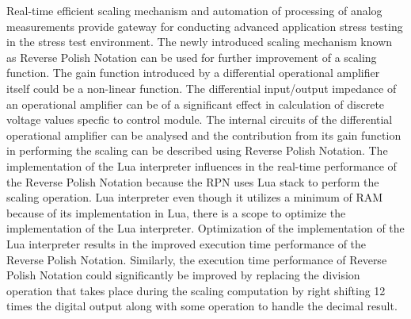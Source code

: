 Real-time efficient scaling mechanism and automation of processing of analog measurements provide gateway for conducting advanced application stress testing in the stress test environment.
The newly introduced scaling mechanism known as Reverse Polish Notation can be used for further improvement of a scaling function. The gain function introduced by a 
differential operational amplifier itself could be a non-linear function. The differential input/output impedance of an operational amplifier can be of a significant effect 
in calculation of discrete voltage values specfic to control module. The internal circuits of the differential operational amplifier can be analysed and the
contribution from its gain function in performing the scaling can be described using Reverse Polish Notation. The implementation of the Lua interpreter influences in the real-time performance of the Reverse Polish Notation because the RPN uses Lua stack to perform the scaling operation. Lua interpreter even though it utilizes a minimum of RAM because of its implementation in Lua, there is a scope to optimize the implementation of the Lua interpreter. Optimization of the implementation of the Lua interpreter results in the improved execution time performance of the Reverse Polish Notation. Similarly, the execution time performance of Reverse Polish Notation could significantly be improved by replacing the division operation that takes place during the scaling computation by right shifting 12 times the digital output along with some operation to handle the decimal result. 
